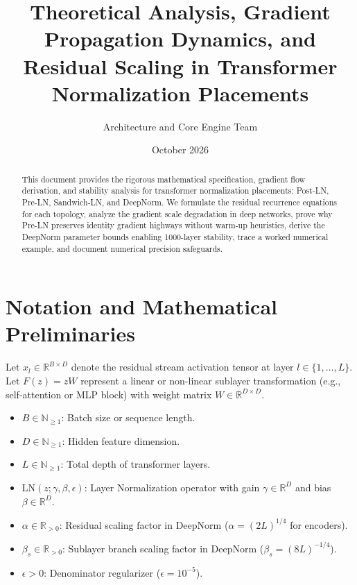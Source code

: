 \documentclass[11pt,a4paper]{article}
\title{\textbf{Theoretical Analysis, Gradient Propagation Dynamics, and Residual Scaling in Transformer Normalization Placements}}
\author{Architecture and Core Engine Team}
\date{October 2026}
\theoremstyle{definition}
\begin{document}
\maketitle

\begin{abstract}
This document provides the rigorous mathematical specification, gradient flow derivation, and stability analysis for transformer normalization placements: Post-LN, Pre-LN, Sandwich-LN, and DeepNorm. We formulate the residual recurrence equations for each topology, analyze the gradient scale degradation in deep networks, prove why Pre-LN preserves identity gradient highways without warm-up heuristics, derive the DeepNorm parameter bounds enabling 1000-layer stability, trace a worked numerical example, and document numerical precision safeguards.
\end{abstract}

\section{Notation and Mathematical Preliminaries}

Let $x_l \in \mathbb{R}^{B \times D}$ denote the residual stream activation tensor at layer $l \in \{1, \dots, L\}$. Let $F(z) = z W$ represent a linear or non-linear sublayer transformation (e.g., self-attention or MLP block) with weight matrix $W \in \mathbb{R}^{D \times D}$.

\begin{itemize}
    \item $B \in \mathbb{N}_{\ge 1}$: Batch size or sequence length.
    \item $D \in \mathbb{N}_{\ge 1}$: Hidden feature dimension.
    \item $L \in \mathbb{N}_{\ge 1}$: Total depth of transformer layers.
    \item $\text{LN}(z; \gamma, \beta, \epsilon)$: Layer Normalization operator with gain $\gamma \in \mathbb{R}^D$ and bias $\beta \in \mathbb{R}^D$.
    \item $\alpha \in \mathbb{R}_{> 0}$: Residual scaling factor in DeepNorm ($\alpha = (2L)^{1/4}$ for encoders).
    \item $\beta_s \in \mathbb{R}_{> 0}$: Sublayer branch scaling factor in DeepNorm ($\beta_s = (8L)^{-1/4}$).
    \item $\epsilon > 0$: Denominator regularizer ($\epsilon = 10^{-5}$).
\end{itemize}
\end{document}
